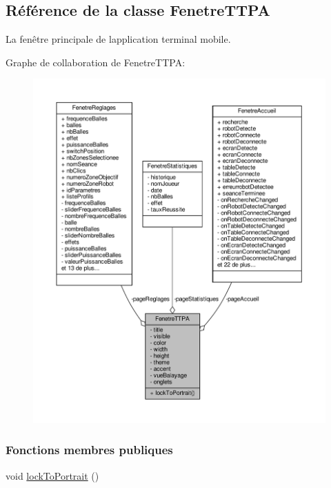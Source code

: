 \hypertarget{class_fenetre_t_t_p_a}{}\subsection{Référence de la classe Fenetre\+T\+T\+PA}
\label{class_fenetre_t_t_p_a}


La fenêtre principale de l\textquotesingle{}application terminal mobile.  




Graphe de collaboration de Fenetre\+T\+T\+PA\+:
\nopagebreak
\begin{figure}[H]
\begin{center}
\leavevmode
\includegraphics[width=350pt]{class_fenetre_t_t_p_a__coll__graph}
\end{center}
\end{figure}
\subsubsection*{Fonctions membres publiques}
\begin{DoxyCompactItemize}
\item 
void \hyperlink{class_fenetre_t_t_p_a_a29bb2367bd1acce210a92397e9ab2347}{lock\+To\+Portrait} ()
\end{DoxyCompactItemize}

